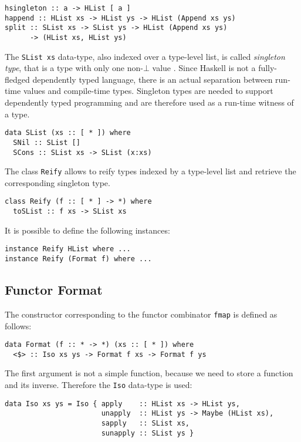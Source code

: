 \documentclass[../Thesis.tex]{subfiles}
\begin{document}
\begin{verbatim}
hsingleton :: a -> HList [ a ]
happend :: HList xs -> HList ys -> HList (Append xs ys)
split :: SList xs -> SList ys -> HList (Append xs ys) 
      -> (HList xs, HList ys)
\end{verbatim}

The \texttt{SList xs} data-type, also indexed over a type-level list, is called \emph{singleton type}, that is a type with only one non-$\bot$ value \cite{Eisenberg12DTPS}. Since Haskell is not a fully-fledged dependently typed language, there is an actual separation between run-time values and compile-time types. Singleton types are needed to support dependently typed programming and are therefore used as a run-time witness of a type.

\begin{verbatim}
data SList (xs :: [ * ]) where
  SNil :: SList []
  SCons :: SList xs -> SList (x:xs)
\end{verbatim}

The class \texttt{Reify} allows to reify types indexed by a type-level list and retrieve the corresponding singleton type.

\begin{verbatim}
class Reify (f :: [ * ] -> *) where
  toSList :: f xs -> SList xs
\end{verbatim}

It is possible to define the following instances:

\begin{verbatim}
instance Reify HList where ...
instance Reify (Format f) where ...
\end{verbatim}

\subsection{Functor Format}
The constructor corresponding to the functor combinator \texttt{fmap} is defined as follows:

\begin{verbatim}
data Format (f :: * -> *) (xs :: [ * ]) where
  <$> :: Iso xs ys -> Format f xs -> Format f ys
\end{verbatim}

The first argument is not a simple function, because we need to store 
a function and its inverse. Therefore the \texttt{Iso} data-type is used:

\begin{verbatim}
data Iso xs ys = Iso { apply    :: HList xs -> HList ys, 
                       unapply  :: HList ys -> Maybe (HList xs), 
                       sapply   :: SList xs, 
                       sunapply :: SList ys }
\end{verbatim}
\end{document}
